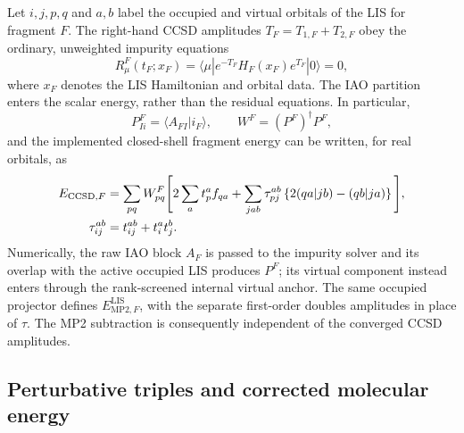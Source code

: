 \documentclass[11pt]{article}
\begin{document}
Let $i,j,p,q$ and $a,b$ label the occupied and virtual orbitals of the LIS for
fragment $F$.  The right-hand CCSD amplitudes $T_F=T_{1,F}+T_{2,F}$ obey the
ordinary, unweighted impurity equations
\begin{equation}
 R_\mu^F(t_F;x_F)=
 \langle\mu|e^{-T_F}H_F(x_F)e^{T_F}|0\rangle=0,
 \label{eq:lis-cc-residual}
\end{equation}
where $x_F$ denotes the LIS Hamiltonian and orbital data.  The IAO partition
enters the scalar energy, rather than the residual equations.  In particular,
\begin{equation}
 P_{Ii}^F=\langle A_{FI}|i_F\rangle,
 \qquad W^F=(P^F)^\dagger P^F,
 \label{eq:lis-fragment-projector}
\end{equation}
and the implemented closed-shell fragment energy can be written, for real
orbitals, as
\begin{align}
 E_{\mathrm{CCSD},F}
 &=\sum_{pq}W_{pq}^F\Bigg[
  2\sum_a t_p^a f_{qa}
  +\sum_{jab}\tau_{pj}^{ab}
   \left\{2(qa|jb)-(qb|ja)\right\}\Bigg],
 \notag\\
 \tau_{ij}^{ab}&=t_{ij}^{ab}+t_i^at_j^b.
 \label{eq:lis-weighted-cc-energy}
\end{align}
Numerically, the raw IAO block $A_F$ is passed to the impurity solver and its
overlap with the active occupied LIS produces $P^F$; its virtual component
instead enters through the rank-screened internal virtual anchor.  The same
occupied projector defines $E_{\mathrm{MP2},F}^{\mathrm{LIS}}$, with the
separate first-order doubles amplitudes in place of $\tau$.  The MP2
subtraction is consequently independent of the converged CCSD amplitudes.

\subsection{Perturbative triples and corrected molecular energy}
\end{document}
